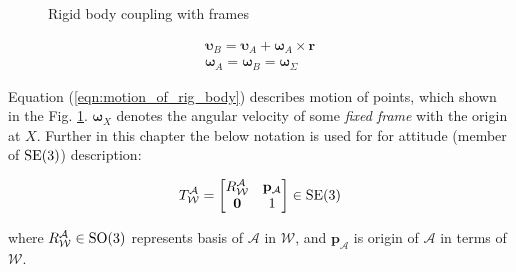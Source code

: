 \begin{figure}[H]
    \caption{Rigid body coupling with frames}
    \label{fig:coupling_rigid_body}
\end{figure}

\begin{equation}
    \begin{aligned}
        \boldsymbol{\upsilon}_B = \boldsymbol{\upsilon}_A + 
        \boldsymbol{\omega}_A \times \mathbf{r} \\
        \boldsymbol{\omega}_A = \boldsymbol{\omega}_B 
        = \boldsymbol{\omega}_{\Sigma}
    \end{aligned}
    \label{eqn:motion_of_rig_body}
\end{equation}

Equation (\ref{eqn:motion_of_rig_body}) describes motion of points, which 
shown in the Fig. {\ref{fig:coupling_rigid_body}}. $\boldsymbol{\omega}_X$ 
denotes the angular velocity of some \emph{fixed frame} with the origin at $X$.
Further in this chapter the below notation is used for for attitude (member of $\text{SE}(3)$) 
description:

\begin{equation}
    T_{\mathcal{W}}^{\mathcal{A}} = 
    \begin{bmatrix}
        R^{\mathcal{A}}_{\mathcal{W}} & \mathbf{p}_{\mathcal{A}} \\
        \mathbf{0} & 1
    \end{bmatrix}
    \in \text{SE}(3)
    \label{eqn:se_3_element}
\end{equation}

where $R^{\mathcal{A}}_{\mathcal{W}} \in \text{SO}(3)$ represents basis of $\mathcal{A}$ 
in $\mathcal{W}$, and $\mathbf{p}_{\mathcal{A}}$ is origin of $\mathcal{A}$ in 
terms of $\mathcal{W}$.

